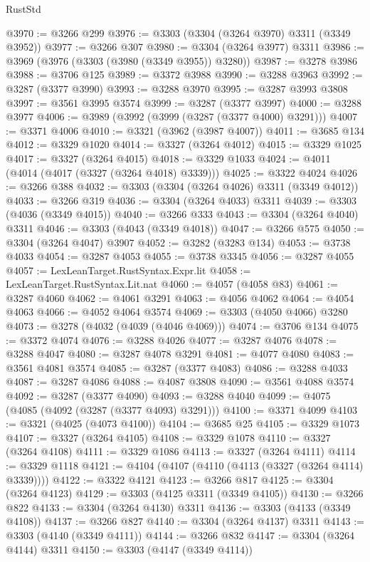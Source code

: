 \begin{lexlean}{RustStd}
\begin{coremodule}
@3970 := @3266 @299
@3976 := @3303 (@3304 (@3264 @3970) @3311 (@3349 @3952))
@3977 := @3266 @307
@3980 := @3304 (@3264 @3977) @3311
@3986 := @3969 (@3976 (@3303 (@3980 (@3349 @3955)) @3280))
@3987 := @3278 @3986
@3988 := @3706 @125
@3989 := @3372 @3988
@3990 := @3288 @3963
@3992 := @3287 (@3377 @3990)
@3993 := @3288 @3970
@3995 := @3287 @3993 @3808
@3997 := @3561 @3995 @3574
@3999 := @3287 (@3377 @3997)
@4000 := @3288 @3977
@4006 := @3989 (@3992 (@3999 (@3287 (@3377 @4000) @3291)))
@4007 := @3371 @4006
@4010 := @3321 (@3962 (@3987 @4007))
@4011 := @3685 @134
@4012 := @3329 @1020
@4014 := @3327 (@3264 @4012)
@4015 := @3329 @1025
@4017 := @3327 (@3264 @4015)
@4018 := @3329 @1033
@4024 := @4011 (@4014 (@4017 (@3327 (@3264 @4018) @3339)))
@4025 := @3322 @4024
@4026 := @3266 @388
@4032 := @3303 (@3304 (@3264 @4026) @3311 (@3349 @4012))
@4033 := @3266 @319
@4036 := @3304 (@3264 @4033) @3311
@4039 := @3303 (@4036 (@3349 @4015))
@4040 := @3266 @333
@4043 := @3304 (@3264 @4040) @3311
@4046 := @3303 (@4043 (@3349 @4018))
@4047 := @3266 @575
@4050 := @3304 (@3264 @4047) @3907
@4052 := @3282 (@3283 @134)
@4053 := @3738 @4033
@4054 := @3287 @4053
@4055 := @3738 @3345
@4056 := @3287 @4055
@4057 := LexLeanTarget.RustSyntax.Expr.lit
@4058 := LexLeanTarget.RustSyntax.Lit.nat
@4060 := @4057 (@4058 @83)
@4061 := @3287 @4060
@4062 := @4061 @3291
@4063 := @4056 @4062
@4064 := @4054 @4063
@4066 := @4052 @4064 @3574
@4069 := @3303 (@4050 @4066) @3280
@4073 := @3278 (@4032 (@4039 (@4046 @4069)))
@4074 := @3706 @134
@4075 := @3372 @4074
@4076 := @3288 @4026
@4077 := @3287 @4076
@4078 := @3288 @4047
@4080 := @3287 @4078 @3291
@4081 := @4077 @4080
@4083 := @3561 @4081 @3574
@4085 := @3287 (@3377 @4083)
@4086 := @3288 @4033
@4087 := @3287 @4086
@4088 := @4087 @3808
@4090 := @3561 @4088 @3574
@4092 := @3287 (@3377 @4090)
@4093 := @3288 @4040
@4099 := @4075 (@4085 (@4092 (@3287 (@3377 @4093) @3291)))
@4100 := @3371 @4099
@4103 := @3321 (@4025 (@4073 @4100))
@4104 := @3685 @25
@4105 := @3329 @1073
@4107 := @3327 (@3264 @4105)
@4108 := @3329 @1078
@4110 := @3327 (@3264 @4108)
@4111 := @3329 @1086
@4113 := @3327 (@3264 @4111)
@4114 := @3329 @1118
@4121 := @4104 (@4107 (@4110 (@4113 (@3327 (@3264 @4114) @3339))))
@4122 := @3322 @4121
@4123 := @3266 @817
@4125 := @3304 (@3264 @4123)
@4129 := @3303 (@4125 @3311 (@3349 @4105))
@4130 := @3266 @822
@4133 := @3304 (@3264 @4130) @3311
@4136 := @3303 (@4133 (@3349 @4108))
@4137 := @3266 @827
@4140 := @3304 (@3264 @4137) @3311
@4143 := @3303 (@4140 (@3349 @4111))
@4144 := @3266 @832
@4147 := @3304 (@3264 @4144) @3311
@4150 := @3303 (@4147 (@3349 @4114))

\end{coremodule}
\end{lexlean}
